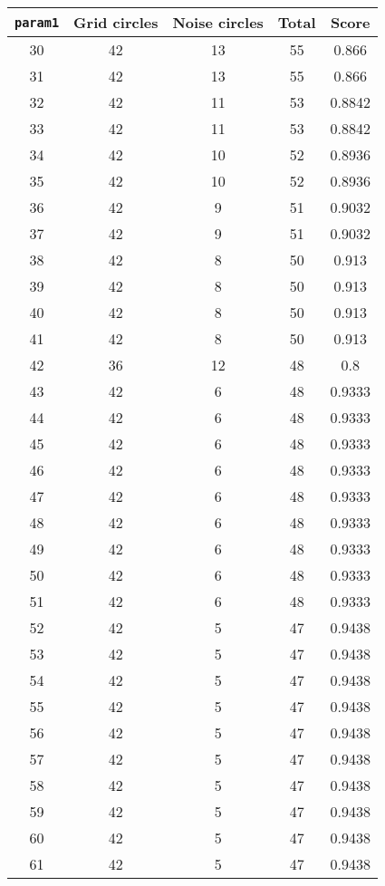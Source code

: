 \documentclass[letterpaper, 12pt]{article}
\begin{document}
\begin{longtable}{|c|c|c|c|c|}
\hline
\textbf{\texttt{param1}} & \textbf{Grid circles} & \textbf{Noise circles} & \textbf{Total} & \textbf{Score} \\
\hline
30 & 42 & 13 & 55 & 0.866 \\
\hline
31 & 42 & 13 & 55 & 0.866 \\
\hline
32 & 42 & 11 & 53 & 0.8842 \\
\hline
33 & 42 & 11 & 53 & 0.8842 \\
\hline
34 & 42 & 10 & 52 & 0.8936 \\
\hline
35 & 42 & 10 & 52 & 0.8936 \\
\hline
36 & 42 & 9 & 51 & 0.9032 \\
\hline
37 & 42 & 9 & 51 & 0.9032 \\
\hline
38 & 42 & 8 & 50 & 0.913 \\
\hline
39 & 42 & 8 & 50 & 0.913 \\
\hline
40 & 42 & 8 & 50 & 0.913 \\
\hline
41 & 42 & 8 & 50 & 0.913 \\
\hline
42 & 36 & 12 & 48 & 0.8 \\
\hline
43 & 42 & 6 & 48 & 0.9333 \\
\hline
44 & 42 & 6 & 48 & 0.9333 \\
\hline
45 & 42 & 6 & 48 & 0.9333 \\
\hline
46 & 42 & 6 & 48 & 0.9333 \\
\hline
47 & 42 & 6 & 48 & 0.9333 \\
\hline
48 & 42 & 6 & 48 & 0.9333 \\
\hline
49 & 42 & 6 & 48 & 0.9333 \\
\hline
50 & 42 & 6 & 48 & 0.9333 \\
\hline
51 & 42 & 6 & 48 & 0.9333 \\
\hline
52 & 42 & 5 & 47 & 0.9438 \\
\hline
53 & 42 & 5 & 47 & 0.9438 \\
\hline
54 & 42 & 5 & 47 & 0.9438 \\
\hline
55 & 42 & 5 & 47 & 0.9438 \\
\hline
56 & 42 & 5 & 47 & 0.9438 \\
\hline
57 & 42 & 5 & 47 & 0.9438 \\
\hline
58 & 42 & 5 & 47 & 0.9438 \\
\hline
59 & 42 & 5 & 47 & 0.9438 \\
\hline
60 & 42 & 5 & 47 & 0.9438 \\
\hline
61 & 42 & 5 & 47 & 0.9438 \\

\end{longtable}
\end{document}
